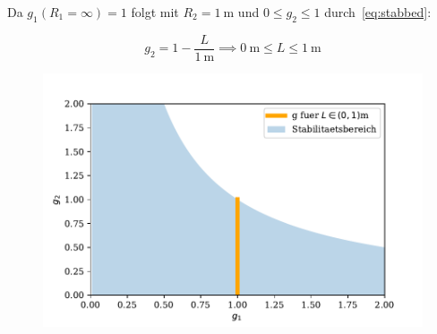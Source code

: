 \documentclass[10pt, aspectratio=169]{beamer}
\begin{document}
\begin{frame}
   Da \(g_1(R_1=\infty)=1\) folgt mit
  \(R_2=\SI{1}{\meter}\) und \(0\leq g_2\leq 1\)
  durch~\ref{eq:stabbed}:

  \begin{equation}
    \label{eq:stabber}
    g_2=1-\frac{L}{\SI{1}{\meter}}\implies\SI{0}{\meter}\leq L \leq \SI{1}{\meter}
  \end{equation}

  \begin{figure}[H]\centering
    \includegraphics[width=.5\columnwidth]{figs/stabdiag.pdf}
  \end{figure}
\end{frame}
\end{document}
